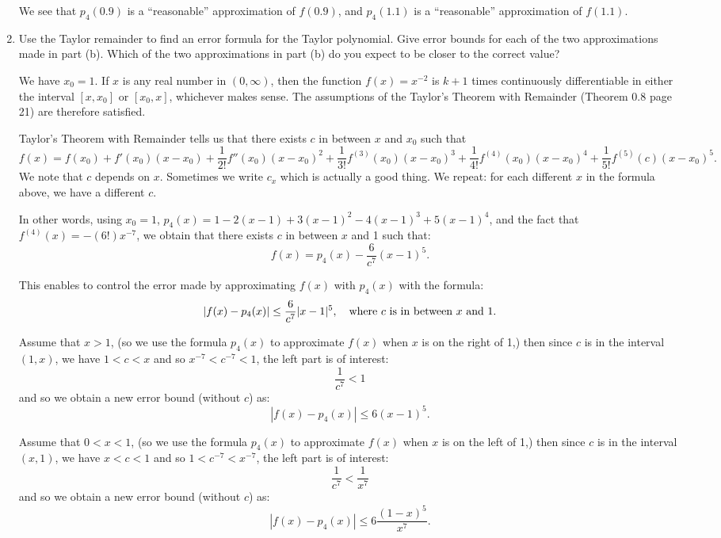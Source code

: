 \documentclass[pdftex,11pt]{article}
\begin{document}
\begin{enumerate}
We see that $p_4(0.9)$ is a ``reasonable'' approximation of $f(0.9)$, and
$p_4(1.1)$ is a ``reasonable'' approximation of $f(1.1)$.

\color{red}\item
Use the Taylor remainder to find an error formula for the Taylor polynomial.
Give error bounds for each of the two approximations made in part (b). Which of
the two approximations in part (b) do you expect to be closer to the correct
value?\\
\color{black}

We have $x_0=1$. If $x$ is any real number in $(0,\infty)$, then the function 
$f(x)=x^{-2}$ is $k+1$ times continuously differentiable in either the interval 
$[x,x_0]$ or $[x_0,x]$, whichever makes sense. The assumptions of the
Taylor's Theorem with Remainder (Theorem 0.8 page 21) are therefore satisfied.

Taylor's Theorem with Remainder tells us that there exists $c$ in between $x$ and $x_0$ such that
$$f(x) = 
f(x_0) 
+ f'(x_0) (x-x_0)
+ \frac{1}{2!} f''(x_0) (x-x_0)^2
+ \frac{1}{3!} f^{(3)}(x_0) (x-x_0)^3
+ \frac{1}{4!} f^{(4)}(x_0) (x-x_0)^4
+ \frac{1}{5!} f^{(5)}(c) (x-x_0)^5.
$$
We note that $c$ depends on $x$. Sometimes we write $c_x$ which is actually a good thing.
We repeat: for each different $x$ in the formula above, we have a different $c$.

In other words, using $x_0=1$, $p_4(x)= 1 - 2 (x-1) + 3 (x-1)^2 - 4 (x-1)^3 + 5 (x-1)^4$, 
and the fact that $f^{(4)}(x) = - (6!)x^{-7}$, we obtain that
there exists $c$ in between $x$ and 1 such that:
$$ f(x) = p_4(x) - \frac{6}{c^7} (x-1)^5.$$

This enables to control the error made by approximating $f(x)$ with $p_4(x)$ with the formula:
$$ | f(x) -  p_4(x) | \leq  \frac{6}{c^7} |x-1|^5,
\quad \textmd{where }c\textmd{ is in between }x\textmd{ and 1}.$$

Assume that $x>1$, (so we use the formula $p_4(x)$ to approximate $f(x)$ when $x$ is on the right of 1,) then
since $c$ is in the interval $(1,x)$, 
we have $1<c<x$  and so $x^{-7}<c^{-7}<1$, the left part is of interest:
$$\frac{1}{c^7} < 1 $$
and so we obtain a new error bound (without $c$) as:
$$ | f(x) -  p_4(x) | \leq  6 (x-1)^5.$$

Assume that $0<x<1$, (so we use the formula $p_4(x)$ to approximate $f(x)$ when $x$ is on the left of 1,) then
since $c$ is in the interval $(x,1)$, 
we have $x<c<1$  and so $1<c^{-7}<x^{-7}$,  the left part is of interest:
$$\frac{1}{c^7} < \frac{1}{x^7} $$
and so we obtain a new error bound (without $c$) as:
$$ | f(x) -  p_4(x) | \leq  6 \frac{(1-x)^5}{x^7}.$$


\end{enumerate}
\end{document}
